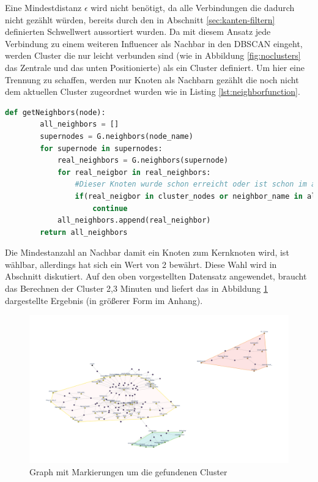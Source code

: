 Eine Mindestdistanz $\epsilon$ wird nicht benötigt, da alle Verbindungen die dadurch nicht gezählt würden, bereits durch den in Abschnitt \ref{sec:kanten-filtern} definierten Schwellwert aussortiert wurden.
Da mit diesem Ansatz jede Verbindung zu einem weiteren Influencer als Nachbar in den DBSCAN eingeht, werden \gls{Cluster} die nur leicht verbunden sind (wie in Abbildung \ref{fig:noclusters} das Zentrale und das unten Positionierte) als ein \gls{Cluster} definiert. 
Um hier eine Trennung zu schaffen, werden nur Knoten als Nachbarn gezählt die noch nicht dem aktuellen \gls{Cluster} zugeordnet wurden wie in Listing \ref{lst:neighborfunction}.
\begin{lstlisting}[language=Python,caption={Abwandlung der DBSCAN Nachbarfunktion},label={lst:neighborfunction}]
	def getNeighbors(node):
		all_neighbors = []
		supernodes = G.neighbors(node_name)
		for supernode in supernodes:
			real_neighbors = G.neighbors(supernode)
			for real_neigbor in real_neighbors:
				#Dieser Knoten wurde schon erreicht oder ist schon im aktuellen Cluster
				if(real_neigbor in cluster_nodes or neighbor_name in all_neighbors):
					continue
			all_neighbors.append(real_neighbor)
		return all_neighbors
\end{lstlisting}
Die Mindestanzahl an Nachbar damit ein Knoten zum Kernknoten wird, ist wählbar, allerdings hat sich ein Wert von 2 bewährt. Diese Wahl wird in Abschnitt diskutiert.
Auf den oben vorgestellten Datensatz angewendet, braucht das Berechnen der \gls{Cluster} 2,3 Minuten und liefert das in Abbildung \ref{fig:clustersscreenshot} dargestellte Ergebnis (in größerer Form im Anhang).
\begin{figure}[h!]
	\centering
	\includegraphics[width=\linewidth]{images/Clusters_screenshot}
	\caption{Graph mit Markierungen um die gefundenen \gls{Cluster}}
	\label{fig:clustersscreenshot}
\end{figure}

